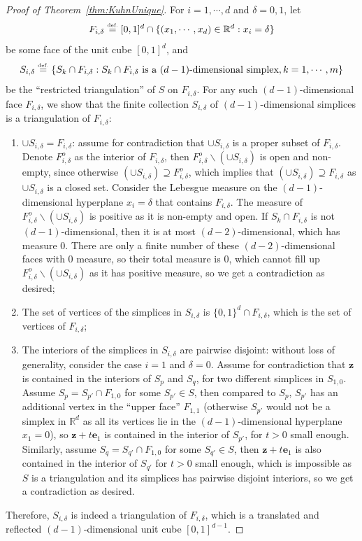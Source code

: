 \documentclass{article}
\numberwithin{equation}{section}
\theoremstyle{definition}
\newcommand{\eqdef}{\ensuremath{\stackrel{\mbox{\upshape\tiny def.}}{=}}}
\begin{document}
\begin{proof}[{Proof of Theorem~\ref{thm:KuhnUnique}}]
For $i=1,\cdots,d$ and $\delta=0,1$, let 
$$F_{i,\delta} \eqdef [0,1]^d \cap \{(x_1,\cdots,x_d)\in\mathbb{R}^d : x_i = \delta\}$$ 
be some face of the unit cube $[0,1]^d$, and 
$$S_{i,\delta}  \eqdef  \{S_k \cap F_{i,\delta} : 
S_k \cap F_{i,\delta} \text{ is a } (d-1) \text{-dimensional simplex},
k=1,\cdots,m\}$$
be the ``restricted triangulation'' of $S$ on $F_{i,\delta}$. For any such $(d-1)$-dimensional face $F_{i,\delta}$, we show that the finite collection $S_{i,\delta}$ of $(d-1)$-dimensional simplices is a triangulation of $F_{i,\delta}$:
\begin{enumerate}
    \item $\cup S_{i,\delta} = F_{i,\delta}$: assume for contradiction that $\cup S_{i,\delta}$ is a proper subset of $F_{i,\delta}$. Denote $F_{i,\delta}^o$ as the interior of $F_{i,\delta}$, then $F_{i,\delta}^o \backslash (\cup S_{i,\delta})$ is open and non-empty, since otherwise $(\cup S_{i,\delta})\supseteq F_{i,\delta}^o$, which implies that $(\cup S_{i,\delta})\supseteq F_{i,\delta}$ as $\cup S_{i,\delta}$ is a closed set. Consider the Lebesgue measure on the $(d-1)$-dimensional hyperplane $x_i=\delta$ that contains $F_{i,\delta}$. The measure of $F_{i,\delta}^o \backslash (\cup S_{i,\delta})$ is positive as it is non-empty and open. If $S_k \cap F_{i,\delta}$ is not $(d-1)$-dimensional, then it is at most $(d-2)$-dimensional, which has measure $0$. There are only a finite number of these $(d-2)$-dimensional faces with $0$ measure, so their total measure is $0$, which cannot fill up $F_{i,\delta}^o \backslash (\cup S_{i,\delta})$ as it has positive measure, so we get a contradiction as desired;
    \item The set of vertices of the simplices in $S_{i,\delta}$ is $\{0,1\}^d \cap F_{i,\delta}$, which is the set of vertices of $F_{i,\delta}$;
    \item The interiors of the simplices in $S_{i,\delta}$ are pairwise disjoint: without loss of generality, consider the case $i=1$ and $\delta=0$. Assume for contradiction that $\mathbf{z}$ is contained in the interiors of $S_p$ and $S_q$, for two different simplices in $S_{1,0}$. Assume $S_p=S_{p'}\cap F_{1,0}$ for some $S_{p'}\in S$, then compared to $S_p$, $S_{p'}$ has an additional vertex in the ``upper face'' $F_{1,1}$ (otherwise $S_{p'}$ would not be a simplex in $\mathbb{R}^d$ as all its vertices lie in the $(d-1)$-dimensional hyperplane $x_1=0$), so $\mathbf{z} + t \mathbf{e}_1$ is contained in the interior of $S_{p'}$, for $t>0$ small enough. Similarly, assume $S_q=S_{q'}\cap F_{1,0}$ for some $S_{q'}\in S$, then $\mathbf{z} + t \mathbf{e}_1$ is also contained in the interior of $S_{q'}$ for $t>0$ small enough, which is impossible as $S$ is a triangulation and its simplices has pairwise disjoint interiors, so we get a contradiction as desired.
\end{enumerate}
Therefore, $S_{i,\delta}$ is indeed a triangulation of $F_{i,\delta}$, which is a translated and reflected $(d-1)$-dimensional unit cube $[0,1]^{d-1}$. 


\end{proof}
\end{document}
